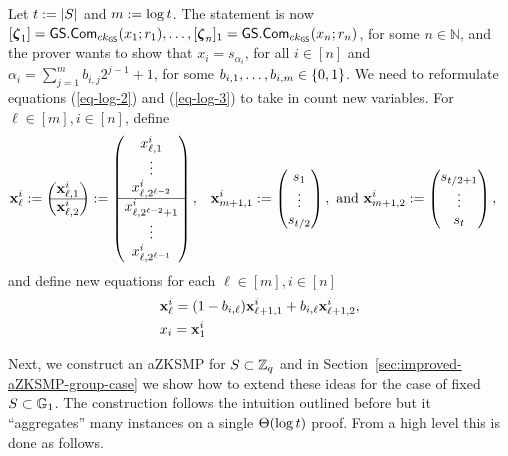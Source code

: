 Let $t:=|S|$ and \(m:=\log t \). The statement is now \([{\boldsymbol \zeta}_1]={\mathsf{GS}}.\mathsf{Com}_{ck_{\mathsf{GS}}}(x_1;r_1),\ldots,\allowbreak[{\boldsymbol \zeta}_n]_1={\mathsf{GS}}.\mathsf{Com}_{ck_{\mathsf{GS}}}(x_n;r_n)\), for some $n\in\mathbb{N}$, and the prover wants to show that \(x_i=s_{\alpha_i}\), for all \(i\in[n]\) and \(\alpha_i=\sum_{j=1}^m b_{i,j}2^{j-1}+1\), for some $b_{i,1},\ldots,b_{i,m}\in\{0,1\}$. We need to reformulate equations (\ref{eq-log-2}) and (\ref{eq-log-3}) to take in count new variables. For \(\ell\in [m],i\in[n]\), define
\begin{align*}
&\mathbf{x}_\ell^i:=
\begin{pmatrix}
\mathbf{x}^i_{\ell,1}\\
\hline
\mathbf{x}^i_{\ell,2}
\end{pmatrix}
:=
\begin{pmatrix}
x^i_{\ell,1}\\\vdots\\x^i_{\ell,2^{\ell-2}}\\
\hline
x^i_{\ell,2^{\ell-2}+1}\\\vdots\\x^i_{\ell,2^{\ell-1}}
\end{pmatrix},
&\mathbf{x}^i_{m+1,1} := \begin{pmatrix}
s_1\\\vdots\\s_{t/2}
\end{pmatrix},\text{ and }
&\mathbf{x}^i_{m+1,2} := \begin{pmatrix}
s_{t/2+1}\\\vdots\\s_{t }
\end{pmatrix},
\end{align*}
and define new equations for each $\ell\in[m],i\in[n]$
\begin{align}
&\mathbf{x}^i_\ell=({1}-{b}_{i,\ell})\mathbf{x}^i_{\ell+1,1}+{b}_{i,\ell}\mathbf{x}^i_{\ell+1,2},\label{eq-alog-1}\\
&x_i= \mathbf{x}^{i}_1\label{eq-alog-2}
\end{align}

Next, we construct an aZKSMP for $S\subset\mathbb{Z}_q$ and in Section~\ref{sec:improved-aZKSMP-group-case} we show how to extend these ideas for the case of fixed \(S\subset\mathbb{G}_1\).
The construction follows the intuition outlined before but it ``aggregates'' many instances on a single \(\Theta(\log t )\) proof. From a high level this is done as follows.

